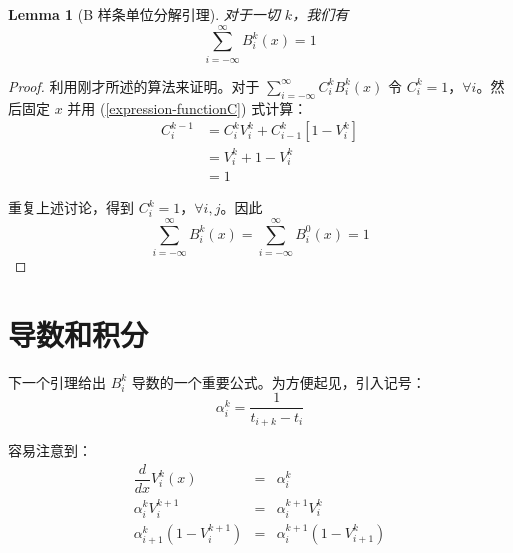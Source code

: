 \documentclass[a4paper]{article}
\newtheorem{lemma}{Lemma}
\begin{document}
\begin{lemma}[B 样条单位分解引理]
\label{lemma-B-Spline-unit-decomposition}
    对于一切 $k$，我们有
    \begin{equation*}
        \sum_{i = -\infty}^{\infty} B_i^k(x) = 1
    \end{equation*}
\end{lemma}
\begin{proof}[Proof]
    利用刚才所述的算法来证明。对于 $\displaystyle\sum_{i = -\infty}^{\infty} C_i^k B_i^k(x)$ 令 $C_i^k = 1$，$\forall i$。然后固定 $x$ 并用 (\ref{expression-functionC}) 式计算：
    \begin{align*}
        C_{i}^{k-1} & = C_{i}^{k} V_{i}^{k} + C_{i-1}^{k} [1 - V_{i}^{k}] \\
        & = V_{i}^{k} + 1 - V_{i}^{k} \\
        & = 1
    \end{align*}

    \noindent 重复上述讨论，得到 $C_i^k = 1$，$\forall i,j$。因此 
    \begin{equation}
        \sum_{i = -\infty}^{\infty} B_i^k(x) = \sum_{i = -\infty}^{\infty} B_i^0(x) = 1
    \end{equation}
\end{proof}
    

\section{导数和积分}

    下一个引理给出 $B_i^k$ 导数的一个重要公式。为方便起见，引入记号：
    \begin{equation}
        \alpha_i^k = \frac{1}{t_{i+k} - t_{i}}
    \end{equation}

    \noindent 容易注意到：
    \begin{eqnarray}
        \dfrac{d}{dx} V_{i}^{k}(x) & = & \alpha_{i}^{k} \\
        \alpha_{i}^{k} V_{i}^{k+1} & = & \alpha_{i}^{k+1} V_{i}^{k} \\
        \alpha_{i+1}^{k} (1 - V_{i}^{k+1}) & = & \alpha_{i}^{k+1} (1 - V_{i+1}^{k})
    \end{eqnarray}
\end{document}
